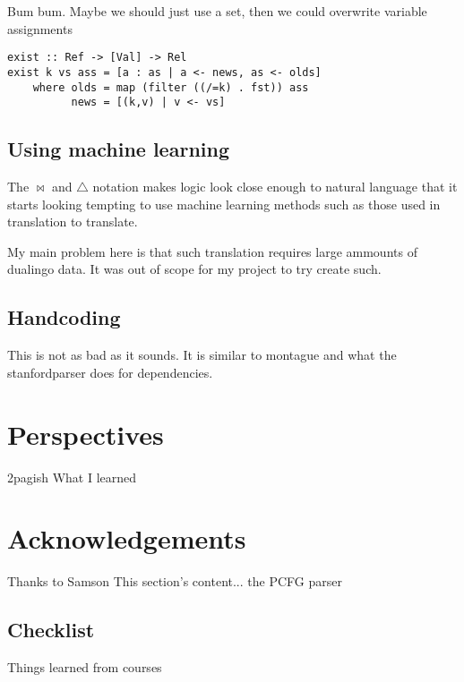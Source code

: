 \documentclass[12pt]{article}
\let\stdsection\section
\renewcommand\section{\newpage\stdsection}
\begin{document}
Bum bum. Maybe we should just use a set, then we could overwrite variable assignments
\begin{lstlisting}
exist :: Ref -> [Val] -> Rel
exist k vs ass = [a : as | a <- news, as <- olds]
	where olds = map (filter ((/=k) . fst)) ass
	      news = [(k,v) | v <- vs]
\end{lstlisting}



\subsection{Using machine learning}
The $\bowtie$ and $\triangle$ notation makes logic look close enough to natural language that it starts looking tempting to use machine learning methods such as those used in translation to translate.

My main problem here is that such translation requires large ammounts of dualingo data. It was out of scope for my project to try create such.

\subsection{Handcoding}
This is not as bad as it sounds. It is similar to montague and what the stanfordparser does for dependencies.

\section{Perspectives}
2pagish
What I learned

\section*{Acknowledgements}
Thanks to Samson
This section's content...\cite{visser1999donkey}
the PCFG parser\cite{klein2003accurate}

\subsection{Checklist}
Things learned from courses




\end{document}
